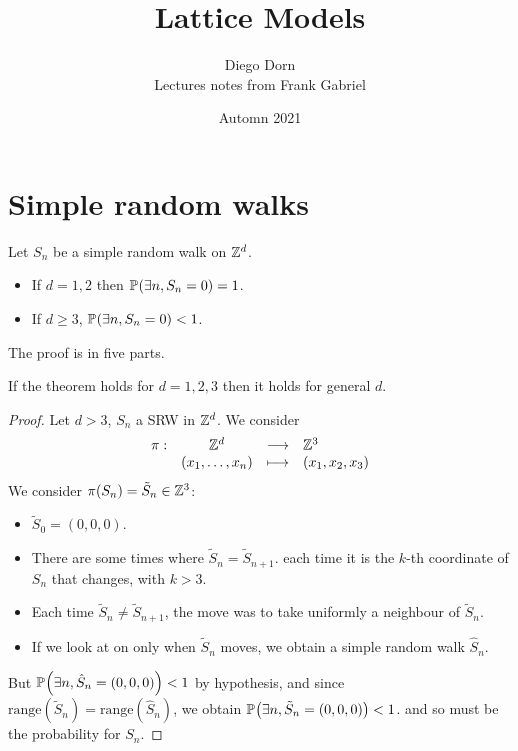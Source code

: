 


\title{Lattice Models}
\author{Diego Dorn \\ Lectures notes from Frank Gabriel}
\date{Automn 2021}

\newcommand{\Isom}{\mathrm{Isom}}
\newcommand{\Acts}{\curvearrowright}
\renewcommand{\P}[1]{\mathbb{P}\hspace{-0.3ex}\left(#1\right)}
\newcommand{\Pcond}[2]{\mathbb{P}\hspace{-0.3ex}\left(#1 \middle| #2 \right)}
\newcommand{\E}[1]{\mathbb{E}\left[#1\right]}
\newcommand{\Fourrier}{\mathcal F}
\newcommand{\IE}{\mathbb{E}}


    \maketitle

    \section{Simple random walks}

    \begin{theorem}
        Let $S_n$ be a simple random walk on $\mathbb Z^d$.
        \begin{itemize}
            \item If $d = 1, 2$ then $\P{\exists n, S_n = 0} = 1$.
            \item If $d \geq 3$, $\P{\exists n, S_n = 0} < 1$.
        \end{itemize}
    \end{theorem}

    The proof is in five parts.

    \begin{claim}
        If the theorem holds for $d = 1, 2, 3$ then it holds for general $d$.
    \end{claim}
    \begin{proof}
        Let $d > 3$, $S_n$ a SRW in $\mathbb Z^d$.
        We consider \[
            \begin{array}{rccl} \pi : & \mathbb Z^d & \longrightarrow & \mathbb Z^3 \\ & (x_1, \dots, x_n) & \longmapsto & (x_1, x_2, x_3) \end{array}
        \]
        We consider $\pi(S_n) = \tilde{S}_n \in \mathbb Z^3$:
        \begin{itemize}
            \item $\tilde{S}_0 = (0, 0, 0)$.
            \item There are some times where $\tilde{S}_n = \tilde{S}_{n+1}$.
                each time it is the $k$-th coordinate of $S_n$ that changes, with $k > 3$.
            \item Each time $\tilde{S}_n \neq \tilde{S}_{n+1}$, 
                the move was to take uniformly a neighbour of $\tilde{S}_n$.
            \item If we look at on only when $\tilde{S}_n$ moves,
                we obtain a simple random walk $\hat{S}_n$.
        \end{itemize}
        But $\P{\exists n, \hat S_n = (0, 0, 0)} < 1$ by hypothesis, 
        and since $\mathrm{range}(\tilde S_n) = \mathrm{range}(\hat S_n)$,
        we obtain
        $\P{\exists n, \tilde S_n = (0, 0, 0)} < 1$.
        and so must be the probability for $S_n$.
    \end{proof}

